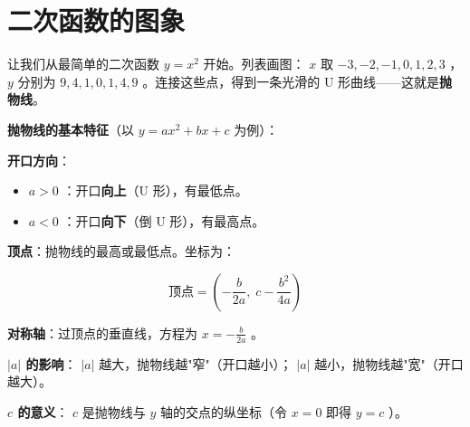 \section*{二次函数的图象}


\begin{explore}


让我们从最简单的二次函数 $y = x^2$ 开始。列表画图： $x$ 取 $-3, -2, -1, 0, 1, 2, 3$ ， $y$ 分别为 $9, 4, 1, 0, 1, 4, 9$ 。连接这些点，得到一条光滑的 U 形曲线——这就是\textbf{抛物线}。

\end{explore}

\begin{understand}


\textbf{抛物线的基本特征}（以 $y = ax^2 + bx + c$ 为例）：

\textbf{开口方向}：

\begin{itemize}
  \item $a > 0$ ：开口\textbf{向上}（U 形），有最低点。
  \item $a < 0$ ：开口\textbf{向下}（倒 U 形），有最高点。
\end{itemize}


\textbf{顶点}：抛物线的最高或最低点。坐标为：

\[
\text{顶点} = \left(-\frac{b}{2a}, \; c - \frac{b^2}{4a}\right)
\]


\textbf{对称轴}：过顶点的垂直线，方程为 $x = -\frac{b}{2a}$ 。

\textbf{ $\lvert a \rvert$ 的影响}： $\lvert a \rvert$ 越大，抛物线越"窄"（开口越小）； $\lvert a \rvert$ 越小，抛物线越"宽"（开口越大）。

\textbf{ $c$ 的意义}： $c$ 是抛物线与 $y$ 轴的交点的纵坐标（令 $x = 0$ 即得 $y = c$ ）。

\end{understand}

